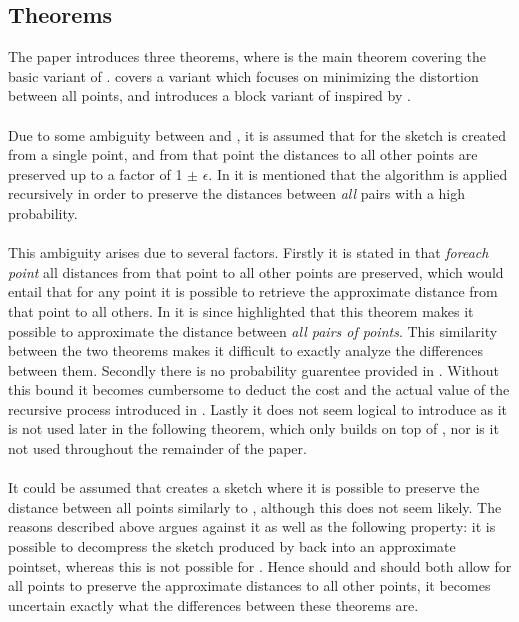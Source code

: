 \subsection{Theorems}
The paper introduces three theorems, where  is the main theorem covering the basic variant of \qs{}.  covers a variant which focuses on minimizing the distortion between all points, and  introduces a block variant of  inspired by \cite{schmid9}.
\\
\\
Due to some ambiguity between  and , it is assumed that for  the sketch is created from a single point, and from that point the distances to all other points are preserved up to a factor of 1 $\pm$ $\epsilon$. In  it is mentioned that the algorithm is applied recursively in order to preserve the distances between \textit{all} pairs with a high probability.
\\
\\
This ambiguity arises due to several factors. Firstly it is stated in  that \textit{foreach point} all distances from that point to all other points are preserved, which would entail that for any point it is possible to retrieve the approximate distance from that point to all others. In  it is since highlighted that this theorem makes it possible to approximate the distance between \textit{all pairs of points}. This similarity between the two theorems makes it difficult to exactly analyze the differences between them. Secondly there is no probability guarentee provided in . Without this bound it becomes cumbersome to deduct the cost and the actual value of the recursive process introduced in . Lastly it does not seem logical to introduce  as it is not used later in the following theorem, which only builds on top of , nor is it not used throughout the remainder of the paper. 
\\
\\
It could be assumed that  creates a sketch where it is possible to preserve the distance between all points similarly to , although this does not seem likely. The reasons described above argues against it as well as the following property: it is possible to decompress the sketch produced by  back into an approximate pointset, whereas this is not possible for . Hence should  and  should both allow for all points to preserve the approximate distances to all other points, it becomes uncertain exactly what the differences between these theorems are. 
